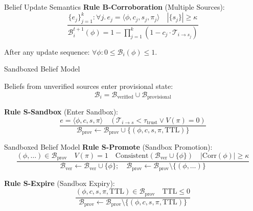 \documentclass[
  ignorenonframetext,
]{beamer}
\begin{document}
\begin{frame}[allowframebreaks]{Belief Update Semantics}
\textbf{Rule B-Corroboration} (Multiple Sources): \begin{equation}
\label{eq:rule-corroboration}
\frac{\{e_j\}_{j=1}^k: \forall j.\, e_j = \langle \phi, c_j, s_j, \pi_j \rangle \quad |\{s_j\}| \geq \kappa}{\mathcal{B}_i^{t+1}(\phi) = 1 - \prod_{j=1}^{k}(1 - c_j \cdot \mathcal{T}_{i \to s_j})}
\end{equation}

\begin{lemma}
\label{lem:belief-bounded}
After any update sequence: $\forall \phi: 0 \leq \mathcal{B}_i(\phi) \leq 1$.
\end{lemma}
\end{frame}

\begin{frame}[allowframebreaks]{Sandboxed Belief Model}
\protect{}\label{sec:sandbox-rules}
\begin{definition}
\label{def:sandbox}
Beliefs from unverified sources enter provisional state:
\begin{equation}
\label{eq:sandbox-partition}
\mathcal{B}_i = \mathcal{B}_{\text{verified}} \cup \mathcal{B}_{\text{provisional}}
\end{equation}
\end{definition}

\textbf{Rule S-Sandbox} (Enter Sandbox): \begin{equation}
\label{eq:rule-sandbox}
\frac{e = \langle \phi, c, s, \pi \rangle \quad (\mathcal{T}_{i \to s} < \tau_{\text{trust}} \lor V(\pi) = 0)}{\mathcal{B}_{\text{prov}} \gets \mathcal{B}_{\text{prov}} \cup \{(\phi, c, s, \pi, \text{TTL})\}}
\end{equation}

\end{frame}

\begin{frame}[allowframebreaks]{Sandboxed Belief Model}
\textbf{Rule S-Promote} (Sandbox Promotion): \begin{equation}
\label{eq:rule-promote}
\frac{(\phi, \ldots) \in \mathcal{B}_{\text{prov}} \quad V(\pi) = 1 \quad \text{Consistent}(\mathcal{B}_{\text{ver}} \cup \{\phi\}) \quad |\text{Corr}(\phi)| \geq \kappa}{\mathcal{B}_{\text{ver}} \gets \mathcal{B}_{\text{ver}} \cup \{\phi\}; \quad \mathcal{B}_{\text{prov}} \gets \mathcal{B}_{\text{prov}} \setminus \{(\phi, \ldots)\}}
\end{equation}

\textbf{Rule S-Expire} (Sandbox Expiry): \begin{equation}
\label{eq:rule-expire}
\frac{(\phi, c, s, \pi, \text{TTL}) \in \mathcal{B}_{\text{prov}} \quad \text{TTL} \leq 0}{\mathcal{B}_{\text{prov}} \gets \mathcal{B}_{\text{prov}} \setminus \{(\phi, c, s, \pi, \text{TTL})\}}
\end{equation}

\end{frame}
\end{document}
